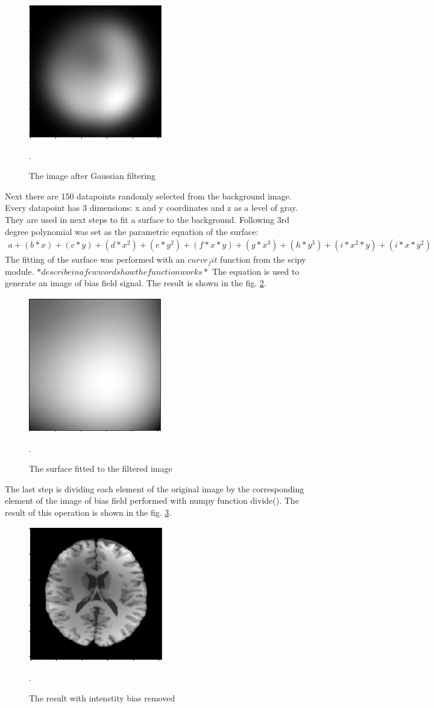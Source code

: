 \begin{figure}[H]
\centering{}\includegraphics[scale=1]{figures/Module_02/m2_2}\caption{The image after Gaussian filtering}. 
\label{fig: Module2_2}
\end{figure}
Next there are 150 datapoints randomly selected from the background image. Every datapoint has 3 dimensions: x and y coordinates and z as a level of gray. They are used in next steps to fit a surface to the background. Following 3rd degree polynomial was set as the parametric equation of the surface:
\begin{equation}
\begin{aligned}
a+(b*x)+(c*y)+(d*x^{2})+(e*y^{2})+(f*x*y)+(g*x^{3})+(h*y^{3})+(i*x^{2}*y)+(i*x*y^{2})
\end{aligned}
\end{equation}
The fitting of the surface was performed with an $curve_fit$ function from the scipy module. $*describe in a few words how the function works*$ The equation is used to generate an image of bias field signal. The result is shown in the fig. \ref{fig: Module2_3}.
\begin{figure}[H]
\centering{}\includegraphics[scale=1]{figures/Module_02/m2_1}\caption{The surface fitted to the filtered image}. 
\label{fig: Module2_3}
\end{figure}
The last step is dividing each element of the original image by the corresponding element of the image of bias field performed with numpy function divide(). The result of this operation is shown in the fig. \ref{fig: Module2_4}.
\begin{figure}[H]
\centering{}\includegraphics[scale=1]{figures/Module_02/m2_4}\caption{The result with intenstity bias removed}. 
\label{fig: Module2_4}
\end{figure}
